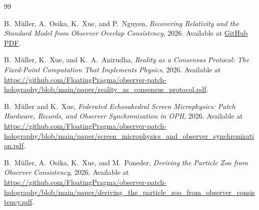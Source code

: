 \begin{thebibliography}{99}

B.~M\"uller, A.~Osika, K.~Xue, and P.~Nguyen,
\emph{Recovering Relativity and the Standard Model from Observer Overlap Consistency},
2026.
Available at \href{https://github.com/FloatingPragma/observer-patch-holography/blob/main/paper/recovering_relativity_and_standard_model_structure_from_observer_overlap_consistency_compact.pdf}{GitHub PDF}.

B.~M\"uller, K.~Xue, and K.~A.~Anirudha,
\emph{Reality as a Consensus Protocol: The Fixed-Point Computation That Implements Physics},
2026.
Available at \url{https://github.com/FloatingPragma/observer-patch-holography/blob/main/paper/reality_as_consensus_protocol.pdf}.

B.~M\"uller and K.~Xue,
\emph{Federated Echosahedral Screen Microphysics: Patch Hardware, Records, and Observer Synchronization in OPH},
2026.
Available at \url{https://github.com/FloatingPragma/observer-patch-holography/blob/main/paper/screen_microphysics_and_observer_synchronization.pdf}.

B.~M\"uller, A.~Osika, K.~Xue, and M.~Poneder,
\emph{Deriving the Particle Zoo from Observer Consistency},
2026.
Available at \url{https://github.com/FloatingPragma/observer-patch-holography/blob/main/paper/deriving_the_particle_zoo_from_observer_consistency.pdf}.



\end{thebibliography}
